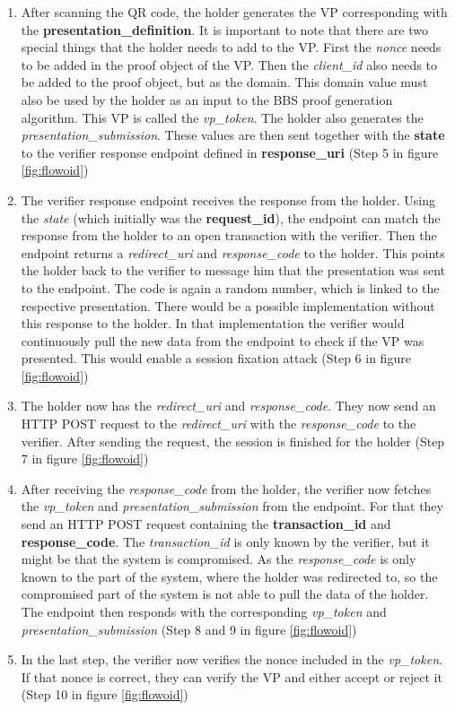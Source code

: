 \documentclass[
	a4paper               %
	,BCOR=0mm            %
	,bibliography=totoc   %
	,listof=totoc         %
	,monolingual
	,twoside=false
]{bfhthesis}              %
\begin{document}
\begin{enumerate}
\begin{itemize}
	\end{itemize}
	\item After scanning the QR code, the holder generates the VP corresponding with the \textbf{presentation\_definition}. It is important to note that there are two special things that the holder needs to add to the VP. First the \textit{nonce} needs to be added in the proof object of the VP. Then the \textit{client\_id} also needs to be added to the proof object, but as the domain. This domain value must also be used by the holder as an input to the BBS proof generation algorithm. This VP is called the \textit{vp\_token}. The holder also generates the \textit{presentation\_submission}. These values are then sent together with the \textbf{state} to the verifier response endpoint defined in \textbf{response\_uri} (Step 5 in figure \ref{fig:flowoid})
	\item The verifier response endpoint receives the response from the holder. Using the \textit{state} (which initially was the \textbf{request\_id}), the endpoint can match the response from the holder to an open transaction with the verifier. Then the endpoint returns a \textit{redirect\_uri} and \textit{response\_code} to the holder. This points the holder back to the verifier to message him that the presentation was sent to the endpoint. The code is again a random number, which is linked to the respective presentation. There would be a possible implementation without this response to the holder. In that implementation the verifier would continuously pull the new data from the endpoint to check if the VP was presented. This would enable a session fixation attack (Step 6 in figure \ref{fig:flowoid})
	\item The holder now has the \textit{redirect\_uri} and \textit{response\_code}. They now send an HTTP POST request to the \textit{redirect\_uri} with the \textit{response\_code} to the verifier. After sending the request, the session is finished for the holder (Step 7 in figure \ref{fig:flowoid})
	\item After receiving the \textit{response\_code} from the holder, the verifier now fetches the \textit{vp\_token} and \textit{presentation\_submission} from the endpoint. For that they send an HTTP POST request containing the \textbf{transaction\_id} and \textbf{response\_code}. The \textit{transaction\_id} is only known by the verifier, but it might be that the system is compromised. As the \textit{response\_code} is only known to the part of the system, where the holder was redirected to, so the compromised part of the system is not able to pull the data of the holder. The endpoint then responds with the corresponding \textit{vp\_token} and \textit{presentation\_submission} (Step 8 and 9 in figure \ref{fig:flowoid})
	\item In the last step, the verifier now verifies the nonce included in the \textit{vp\_token}. If that nonce is correct, they can verify the VP and either accept or reject it (Step 10 in figure \ref{fig:flowoid})
\end{enumerate}
\end{document}
